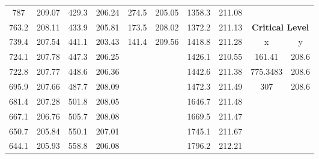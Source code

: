 \begin{center}
\begin{tabular}{|cccc||cccc||cc|}
    787      & 209.07                  & 429.3 & 206.24                       & 274.5 & 205.05                             & 1358.3 & 211.08                                &          &                                    \\
    763.2    & 208.11                  & 433.9 & 205.81                       & 173.5 & 208.02                             & 1372.2 & 211.13                                & \multicolumn{2}{c|}{\textbf{Critical Level}}  \\ 
    \cline{9-10}
    739.4    & 207.54                  & 441.1 & 203.43                       & 141.4 & 209.56                             & 1418.8 & 211.28                                & x        & y                                  \\
    724.1    & 207.78                  & 447.3 & 206.25                       &       &                                    & 1426.1 & 210.55                                & 161.41   & 208.6                              \\
    722.8    & 207.77                  & 448.6 & 206.36                       &       &                                    & 1442.6 & 211.38                                & 775.3483 & 208.6                              \\
    695.9    & 207.66                  & 487.7 & 208.09                       &       &                                    & 1472.3 & 211.49                                & 307      & 208.6                              \\
    681.4    & 207.28                  & 501.8 & 208.05                       &       &                                    & 1646.7 & 211.48                                &          &                                    \\
    667.1    & 206.76                  & 505.7 & 208.08                       &       &                                    & 1669.5 & 211.47                                &          &                                    \\
    650.7    & 205.84                  & 550.1 & 207.01                       &       &                                    & 1745.1 & 211.67                                &          &                                    \\
    644.1    & 205.93                  & 558.8 & 206.08                       &       &                                    & 1796.2 & 212.21                                &          &                                    \\

\end{tabular}
\end{center}
